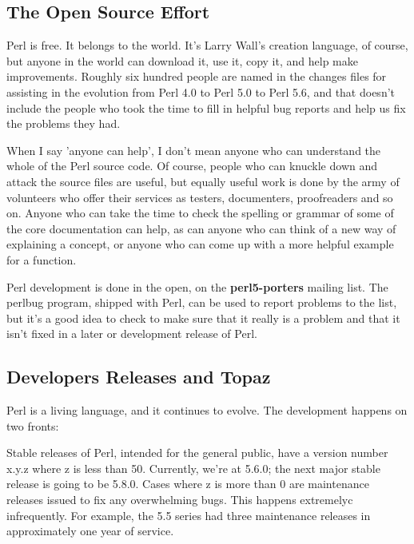 \documentclass[a4paper,11pt]{book}
\begin{document}
\noindent 

\subsection{The Open Source Effort}

\noindent 

\noindent Perl is free. It belongs to the world. It's Larry Wall's creation language, of course, but anyone in the world  can download it, use it, copy it, and help make improvements. Roughly six hundred people are named in the  changes files for assisting in the evolution from Perl 4.0 to Perl 5.0 to Perl 5.6, and that doesn't include the people who took the time to fill in helpful bug reports and help us fix the problems they had.

\noindent 

\noindent When I say 'anyone can help', I don't mean anyone who can understand the whole of the Perl source code. Of course, people who can knuckle down and attack the source files are useful, but equally useful work is done by the army of volunteers who offer their services as testers, documenters, proofreaders and so on. Anyone who can take the time to check the spelling or grammar of some of the core documentation can help, as can anyone who can think of a new way of explaining a concept, or anyone who can come up with a more helpful example for a function.

\noindent 

\noindent Perl development  is done  in the  open,  on  the  \textbf{perl5-porters  }mailing  list.  The perlbug program, shipped with Perl,  can be used  to  report  problems  to  the  list,  but it's  a  good idea  to  check  to make sure that it really is a problem and that it isn't fixed in a later or development release of Perl.

\noindent 

\subsection{Developers Releases and Topaz}

\noindent Perl is a living language, and it continues to evolve. The development happens on two fronts:

\noindent 

\noindent Stable releases of Perl, intended for the general public, have a version number x.y.z  where  z  is less than 50. Currently, we're at 5.6.0; the next major stable release is going to be 5.8.0. Cases where z is more than 0 are maintenance releases issued to fix any overwhelming bugs. This happens extremelyc infrequently. For example, the 5.5 series had three maintenance releases in approximately one year of service.
\end{document}
